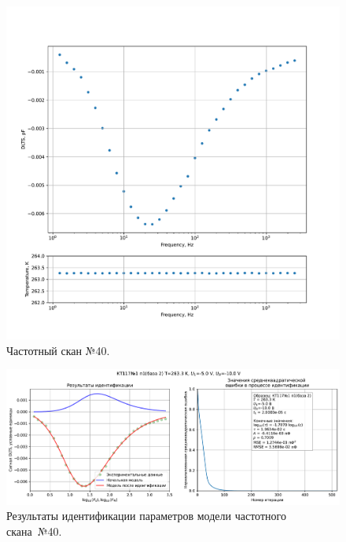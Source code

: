 \begin{figure}[!ht]
    \centering
    \includegraphics[width=1\textwidth]{../plots/КТ117№1_п1(база 2)_2500Гц-1Гц_1пФ_-10С_-5В-10В_100мВ_20мкс_шаг_0,1.pdf}
    \caption{Частотный скан №40.}
    \label{pic:frequency_scan_40}
\end{figure}

\begin{figure}[!ht]
    \centering
    \includegraphics[width=1\textwidth]{../plots/КТ117№1_п1(база 2)_2500Гц-1Гц_1пФ_-10С_-5В-10В_100мВ_20мкс_шаг_0,1_model.pdf}
    \caption{Результаты идентификации параметров модели частотного скана~№40.}
    \label{pic:frequency_scan_model40}
\end{figure}

\pagebreak


